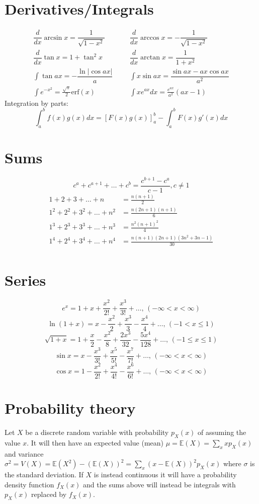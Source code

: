 \section{Derivatives/Integrals}
\begin{align*}
	\dfrac{d}{dx}\arcsin x = \dfrac{1}{\sqrt{1-x^2}} &&& \dfrac{d}{dx}\arccos x = -\dfrac{1}{\sqrt{1-x^2}} \\
	\dfrac{d}{dx}\tan x = 1+\tan^2 x &&& \dfrac{d}{dx}\arctan x = \dfrac{1}{1+x^2} \\
	\int\tan ax = -\dfrac{\ln|\cos ax|}{a} &&& \int x\sin ax = \dfrac{\sin ax-ax \cos ax}{a^2} \\
	\int e^{-x^2} = \frac{\sqrt \pi}{2} \text{erf}(x) &&& \int xe^{ax}dx = \frac{e^{ax}}{a^2}(ax-1)
\end{align*}
Integration by parts:
\[
    \int_a^bf(x)g(x)dx = [F(x)g(x)]_a^b-\int_a^bF(x)g'(x)dx
\]

\section{Sums}
\[ 
    c^a + c^{a+1} + \dots + c^{b} = \frac{c^{b+1} - c^a}{c-1}, c \neq 1 
\]
\begin{align*}
	1 + 2 + 3 + \dots + n &= \frac{n(n+1)}{2} \\
	1^2 + 2^2 + 3^2 + \dots + n^2 &= \frac{n(2n+1)(n+1)}{6} \\
	1^3 + 2^3 + 3^3 + \dots + n^3 &= \frac{n^2(n+1)^2}{4} \\
	1^4 + 2^4 + 3^4 + \dots + n^4 &= \frac{n(n+1)(2n+1)(3n^2 + 3n - 1)}{30} \\
\end{align*}

\section{Series}
\[
    e^x = 1+x+\frac{x^2}{2!}+\frac{x^3}{3!}+\dots,\,(-\infty<x<\infty)
\]
\[
    \ln(1+x) = x-\frac{x^2}{2}+\frac{x^3}{3}-\frac{x^4}{4}+\dots,\,(-1<x\leq1)
\]
\[
    \sqrt{1+x} = 1+\frac{x}{2}-\frac{x^2}{8}+\frac{2x^3}{32}-\frac{5x^4}{128}+\dots,\,(-1\leq x\leq1)
\]
\[
    \sin x = x-\frac{x^3}{3!}+\frac{x^5}{5!}-\frac{x^7}{7!}+\dots,\,(-\infty<x<\infty)
\]
\[
    \cos x = 1-\frac{x^2}{2!}+\frac{x^4}{4!}-\frac{x^6}{6!}+\dots,\,(-\infty<x<\infty)
\]

\section{Probability theory}
Let $X$ be a discrete random variable with probability $p_X(x)$ of assuming the value $x$. It will then have an expected value (mean) $\mu=\mathbb{E}(X)=\sum_xxp_X(x)$ and variance $\sigma^2=V(X)=\mathbb{E}(X^2)-(\mathbb{E}(X))^2=\sum_x(x-\mathbb{E}(X))^2p_X(x)$ where $\sigma$ is the standard deviation. If $X$ is instead continuous it will have a probability density function $f_X(x)$ and the sums above will instead be integrals with $p_X(x)$ replaced by $f_X(x)$.

